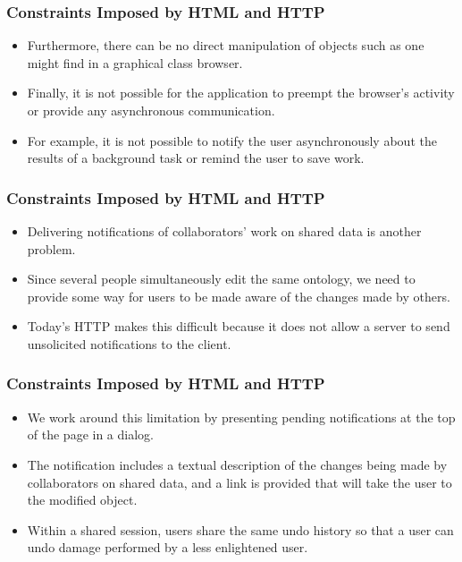 \documentclass{beamer}
\begin{document}
\begin{frame}
\frametitle{Constraints Imposed by HTML and HTTP}

\begin{itemize}
\item Furthermore, there can be no direct manipulation of objects such as one might find in a graphical class browser.
\item Finally, it is not possible for the application to preempt the browser's activity or provide any asynchronous communication.
\item For example, it is not possible to notify the user asynchronously about the results of a background task or remind the user to save work.
\end{itemize}

\end{frame}

\begin{frame}
\frametitle{Constraints Imposed by HTML and HTTP}

\begin{itemize}
\item Delivering notifications of collaborators' work on shared data is another problem.
\item Since several people simultaneously edit the same ontology, we need to provide some way for users to be made aware of the changes made by others.
\item Today's HTTP makes this difficult because it does not allow a server to send unsolicited notifications to the client.
\end{itemize}

\end{frame}

\begin{frame}
\frametitle{Constraints Imposed by HTML and HTTP}

\begin{itemize}
\item We work around this limitation by presenting pending notifications at the top of the page in a dialog.
\item The notification includes a textual description of the changes being made by collaborators on shared data, and a link is provided that will take the user to the modified object.
\item Within a shared session, users share the same undo history so that a user can undo damage performed by a less enlightened user.
\end{itemize}

\end{frame}
\end{document}
